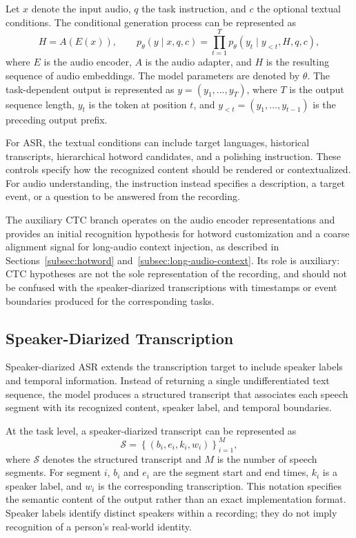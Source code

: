 \documentclass{article}
\begin{document}
Let $x$ denote the input audio, $q$ the task instruction, and $c$ the optional textual conditions. The conditional generation process can be represented as
\begin{equation}
    H = A(E(x)), \qquad
    p_{\theta}(y \mid x,q,c)
    =
    \prod_{t=1}^{T}
    p_{\theta}(y_t \mid y_{<t},H,q,c),
\end{equation}
where $E$ is the audio encoder, $A$ is the audio adapter, and $H$ is the resulting sequence of audio embeddings. The model parameters are denoted by $\theta$. The task-dependent output is represented as $y=(y_1,\ldots,y_T)$, where $T$ is the output sequence length, $y_t$ is the token at position $t$, and $y_{<t}=(y_1,\ldots,y_{t-1})$ is the preceding output prefix.

For ASR, the textual conditions can include target languages, historical transcripts, hierarchical hotword candidates, and a polishing instruction. These controls specify how the recognized content should be rendered or contextualized. For audio understanding, the instruction instead specifies a description, a target event, or a question to be answered from the recording.

The auxiliary CTC branch operates on the audio encoder representations and provides an initial recognition hypothesis for hotword customization and a coarse alignment signal for long-audio context injection, as described in Sections~\ref{subsec:hotword} and~\ref{subsec:long-audio-context}. Its role is auxiliary: CTC hypotheses are not the sole representation of the recording, and should not be confused with the speaker-diarized transcriptions with timestamps or event boundaries produced for the corresponding tasks.

\subsection{Speaker-Diarized Transcription}
\label{subsec:speaker-diarized-output}

Speaker-diarized ASR extends the transcription target to include speaker labels and temporal information. Instead of returning a single undifferentiated text sequence, the model produces a structured transcript that associates each speech segment with its recognized content, speaker label, and temporal boundaries.

At the task level, a speaker-diarized transcript can be represented as
\begin{equation}
    \mathcal{S}
    =
    \left\{
        \left(b_i,e_i,k_i,w_i\right)
    \right\}_{i=1}^{M},
\end{equation}
where $\mathcal{S}$ denotes the structured transcript and $M$ is the number of speech segments. For segment $i$, $b_i$ and $e_i$ are the segment start and end times, $k_i$ is a speaker label, and $w_i$ is the corresponding transcription. This notation specifies the semantic content of the output rather than an exact implementation format. Speaker labels identify distinct speakers within a recording; they do not imply recognition of a person's real-world identity.
\end{document}
